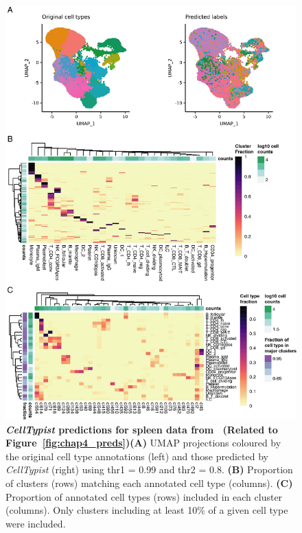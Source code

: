 \begin{figure}[pht!] 
\centering
\includegraphics[scale=0.83]{Appendix2/Figs/appB_spleen.png} %
\caption[\textit{CellTypist} predictions for spleen data from~\citep{madissoon_lung_2019}]{\textbf{\textit{CellTypist} predictions for spleen data from~\citep{madissoon_lung_2019} (Related to Figure~\ref{fig:chap4_preds})}\newline\textbf{(A)} UMAP projections coloured by the original cell type annotations (left) and those predicted by \textit{CellTypist} (right) using thr1 = 0.99 and thr2 = 0.8. \textbf{(B)} Proportion of clusters (rows) matching each annotated cell type (columns). \textbf{(C)} Proportion of annotated cell types (rows) included in each cluster (columns). Only clusters including at least 10\% of a given cell type were included.}
\label{fig:appB_spleen}
\end{figure}


